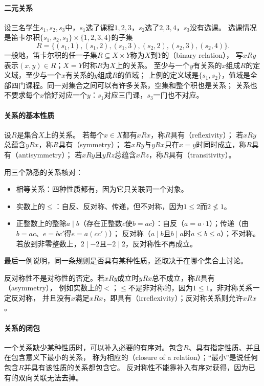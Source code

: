 \paragraph{二元关系}
设三名学生$s_1,s_2,s_3$中，$s_1$选了课程$1,2,3$，$s_2$选了$2,3,4$，$s_3$没有选课。
选课情况是笛卡尔积$\{s_1,s_2,s_3\}\times\{1,2,3,4\}$的子集
\[
 R=\{(s_1,1),(s_1,2),(s_1,3),(s_2,2),(s_2,3),(s_2,4)\}.
\]
一般地，笛卡尔积的任一子集$R\subseteq X\times Y$称为$X$到$Y$的（binary relation），
写$xRy$表示$(x,y)\in R$；$X=Y$时称$R$为$X$上的关系。
至少与一个$y$有关系的$x$组成$R$的定义域，至少与一个$x$有关系的$y$组成$R$的值域；
上例的定义域是$\{s_1,s_2\}$，值域是全部四门课程。同一对集合之间可以有许多关系，空集和整个积也是关系；
关系也不要求每个$x$恰好对应一个$y$：$s_1$对应三门课，$s_3$一门也不对应。

\paragraph{关系的基本性质}
设$R$是集合$X$上的关系。
若每个$x\in X$都有$xRx$，称$R$具有（reflexivity）；
若$xRy$总蕴含$yRx$，称$R$具有（symmetry）；
若$xRy$与$yRx$只在$x=y$时同时成立，称$R$具有（antisymmetry）；
若$xRy$且$yRz$总蕴含$xRz$，称$R$具有（transitivity）。

用三个熟悉的关系核对：
\begin{itemize}
 \item 相等关系：四种性质都有，因为它只关联同一个对象。
 \item 实数上的$\leq$：自反、反对称、传递，但不对称，因为$1\leq2$而$2\not\leq1$。
 \item 正整数上的整除$a\mid b$（存在正整数$c$使$b=ac$）：自反（$a=a\cdot1$）；传递（由$b=ac$、$e=bc'$得$e=a(cc')$）；
       反对称（$a\mid b$且$b\mid a$时$a\leq b\leq a$）；不对称。若放到非零整数上，$2\mid-2$且$-2\mid2$，反对称性不再成立。
\end{itemize}
最后一例说明，同一条规则是否具有某种性质，还取决于在哪个集合上讨论。

反对称性不是对称性的否定。若$xRy$成立时$yRx$总不成立，称$R$具有（asymmetry），
例如实数上的$<$；$\leq$不是非对称的，因为$1\leq1$。非对称关系一定反对称，
并且没有$x$满足$xRx$，即具有（irreflexivity）；反对称关系则允许$xRx$。

\paragraph{关系的闭包}
一个关系缺少某种性质时，可以补入必要的有序对。包含$R$、具有指定性质、并且在包含意义下最小的关系，
称为相应的（closure of a relation）；“最小”是说任何包含$R$并具有该性质的关系都包含它。
反对称性不能靠补入有序对获得，因为已有的双向关联无法去掉。

